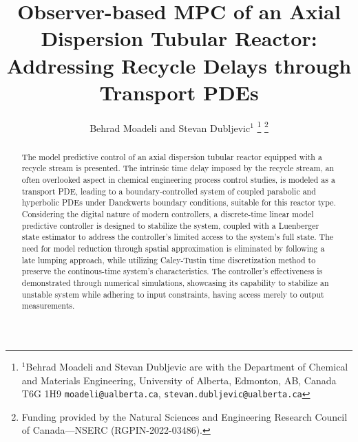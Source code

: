 \documentclass[letterpaper, 10 pt, conference]{ieeeconf}  %
\title{\LARGE \bf
Observer-based MPC of an Axial Dispersion Tubular Reactor:\\ Addressing Recycle Delays through Transport PDEs
}
\author{Behrad Moadeli and Stevan Dubljevic$^{1}$%
\thanks{$^{1}$Behrad Moadeli and Stevan Dubljevic are with the Department of Chemical and Materials Engineering,
University of Alberta, Edmonton, AB, Canada T6G 1H9
{\tt\small moadeli@ualberta.ca}, {\tt\small stevan.dubljevic@ualberta.ca}}%
\thanks{Funding provided by the Natural Sciences and Engineering Research Council of Canada—NSERC (RGPIN-2022-03486).}%
}
\begin{document}
\maketitle
\thispagestyle{empty}
\pagestyle{empty}


\begin{abstract}

        The model predictive control of an axial dispersion tubular reactor equipped with a recycle stream is presented. The intrinsic time delay imposed by the recycle stream, an often overlooked aspect in chemical engineering process control studies, is modeled as a transport PDE, leading to a boundary-controlled system of coupled parabolic and hyperbolic PDEs under Danckwerts boundary conditions, suitable for this reactor type. Considering the digital nature of modern controllers, a discrete-time linear model predictive controller is designed to stabilize the system, coupled with a Luenberger state estimator to address the controller's limited access to the system's full state. The need for model reduction through spatial approximation is eliminated by following a late lumping approach, while utilizing Caley-Tustin time discretization method to preserve the continous-time system's characteristics. The controller's effectiveness is demonstrated through numerical simulations, showcasing its capability to stabilize an unstable system while adhering to input constraints, having access merely to output measurements.

\end{abstract}







% 

% 

\balance

\end{document}
